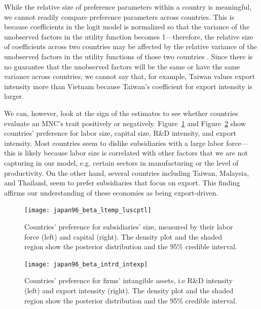 While the relative size of preference parameters within a country is
meaningful, we cannot readily compare preference parameters across countries.
This is because coefficients in the logit model is normalized so
that the variance of the unobserved factors in the utility function becomes
1---therefore, the relative size of coefficients across two countries may be
affected by the relative variance of the unobserved factors in the utility
functions of those two countries \citep[chap. 2]{Train2009}. Since there is no
guarantee that the unobserved factors will be the same or have the same variance
across countries, we cannot say that, for example, Taiwan values export
intensity more than Vietnam because Taiwan's coefficient for export intensity is
larger.

We can, however, look at the sign of the estimates to see whether countries
evaluate an MNC's trait positively or negatively.
Figure~\ref{fig:japan96_beta_ltemp_luscptl} and
Figure~\ref{fig:japan96_beta_intrd_intexp} show countries' preference for labor
size, capital size, R\&D intensity, and export intensity. Most countries seem to
dislike subsidiaries with a large labor force---this is likely because labor
size is correlated with other factors that we are not capturing in our model,
e.g. certain sectors in manufacturing or the level of productivity. On the other
hand, several countries including Taiwan, Malaysia, and Thailand, seem to prefer
subsidiaries that focus on export. This finding affirms our understanding of
these economies as being export-driven.

\begin{figure}[tbp] \centering
  \texttt{[image: japan96\_beta\_ltemp\_luscptl]}
  \caption[Countries' preference for subsidiaries' size.]{Countries' preference for subsidiaries' size, measured by their labor
    force (left) and capital (right). The density plot and the shaded region
    show the posterior distribution and the 95\% credible interval.}
  \label{fig:japan96_beta_ltemp_luscptl}
\end{figure}

\begin{figure}[tbp] \centering
  \texttt{[image: japan96\_beta\_intrd\_intexp]}
  \caption[Countries' preference for firms' intangible assets.]{Countries' preference for firms' intangible assets, i.e R\&D
    intensity (left) and export intensity (right). The density plot and the
    shaded region show the posterior distribution and the 95\% credible
    interval.}
  \label{fig:japan96_beta_intrd_intexp}
\end{figure}


